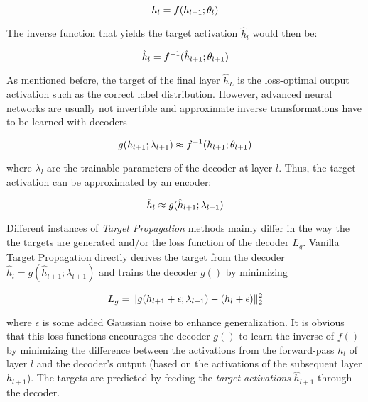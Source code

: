 \begin{equation}\eqlbl{tp1}
	h_l = f(h_{l-1}; \theta_l)
\end{equation}

The inverse function that yields the target activation $\hat{h}_l$ would then be:

\begin{equation}\eqlbl{tp2}
	\hat{h}_l = f^{-1}(\hat{h}_{l+1}; \theta_{l+1})
\end{equation}

As mentioned before, the target of the final layer $\hat{h}_L$ is the loss-optimal output activation such as the correct label distribution.
However, advanced neural networks are usually not invertible and approximate inverse transformations have to be learned with decoders

\begin{equation}\eqlbl{tp3}
	g(h_{l+1}; \lambda_{l+1}) \approx f^{-1}(h_{l+1}; \theta_{l+1})
\end{equation}

where $\lambda_l$ are the trainable parameters of the decoder at layer $l$.
Thus, the target activation can be approximated by an encoder:

\begin{equation}\eqlbl{tp4}
	\hat{h}_l \approx g(\hat{h}_{l+1}; \lambda_{l+1}) 
\end{equation}


Different instances of \emph{Target Propagation} methods mainly differ in the way the the targets are generated and/or the loss function of the decoder $L_{g}$.
Vanilla Target Propagation  directly derives the target from the decoder $\hat{h}_l = g(\hat{h}_{l+1}; \lambda_{l+1})$ and trains the decoder $g()$ by minimizing

\begin{equation}\eqlbl{tp5}
	L_{g} = \lVert g(h_{l+1} + \epsilon; \lambda_{l+1}) - (h_{l} + \epsilon) \rVert_2^2
\end{equation}

where $\epsilon$ is some added Gaussian noise to enhance generalization.
It is obvious that this loss functions encourages the decoder $g()$ to learn the inverse of $f()$ by minimizing the difference between the activations from the forward-pass $h_{l}$ of layer $l$ and the decoder's output (based on the activations of the subsequent layer $h_{l+1}$).
The targets are predicted by feeding the \emph{target activations} $\hat{h}_{l+1}$ through the decoder.

